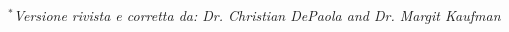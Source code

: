 \documentclass[onecolumn,journal]{IEEEtran}
\begin{document}
\begin{multicols}{2}
\begin{enumerate}

$^*$\small{\textit{Versione rivista e corretta da: Dr. Christian DePaola and Dr. Margit Kaufman}}

\end{enumerate}
\end{multicols}




% 
\end{document}
